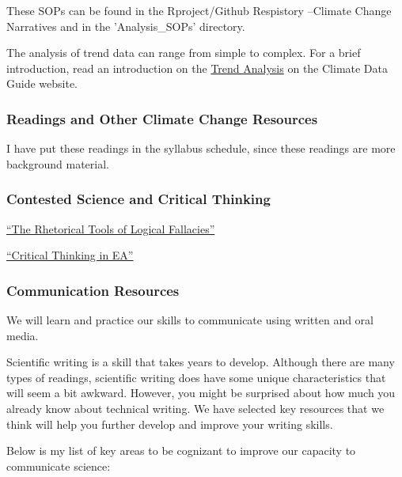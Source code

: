 \documentclass{article}\usepackage[]{graphicx}\usepackage[]{color}
\newenvironment{itemize*}%
  {\begin{itemize}%
    \setlength{\itemsep}{0pt}%
    \setlength{\parskip}{0pt}}%
  {\end{itemize}}
\begin{document}
These SOPs can be found in the Rproject/Github Respistory --Climate Change Narratives and in the 'Analysis\_SOPs' directory.

The analysis of trend data can range from simple to complex. For a brief introduction, read an introduction on the \href{https://climatedataguide.ucar.edu/climate-data-tools-and-analysis/trend-analysis}{Trend Analysis} on the Climate Data Guide website.

\subsubsection{Readings and Other Climate Change Resources}

I have put these readings in the syllabus schedule, since these readings are more background material. 

\subsubsection{Contested Science and Critical Thinking}


\begin{itemize*}
  \item \href{https://github.com/marclos/Climate_Change_Narratives/raw/master/Communication_Resources/Logical_Fallacies.pdf}{``The Rhetorical Tools of Logical Fallacies''}
  
  \item \href{https://github.com/marclos/Climate_Change_Narratives/raw/master/Communication_Resources/Critical_Thinking.pdf}{``Critical Thinking in EA''}
\end{itemize*}

\subsubsection{Communication Resources}

We will learn and practice our skills to communicate using written and oral media. 

Scientific writing is a skill that takes years to develop. Although there are many types of readings, scientific writing does have some unique characteristics that will seem a bit awkward. However, you might be surprised about how much you already know about technical writing. We have selected key resources that we think will help you further develop and improve your writing skills.

Below is my list of key areas to be cognizant to improve our capacity to communicate science:
\end{document}
